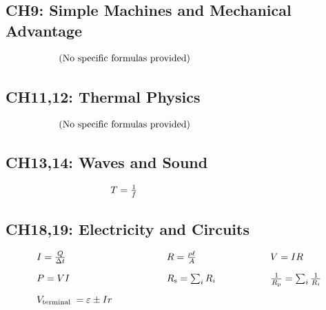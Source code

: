 \documentclass[12pt,a4paper]{article}
\begin{document}
\subsection{CH9: Simple Machines and Mechanical Advantage}
\begin{align*}
\begin{array}{l@{\hspace{2cm}}l@{\hspace{2cm}}l}
\text{(No specific formulas provided)} & &
\end{array}
\end{align*}
\subsection{CH11,12: Thermal Physics}
\begin{align*}
\begin{array}{l@{\hspace{2cm}}l@{\hspace{2cm}}l}
\text{(No specific formulas provided)} & &
\end{array}
\end{align*}
\subsection{CH13,14: Waves and Sound}
\begin{align*}
\begin{array}{l@{\hspace{2cm}}l@{\hspace{2cm}}l}
T=\frac{1}{f} & &
\end{array}
\end{align*}
\subsection{CH18,19: Electricity and Circuits}
\begin{align*}
\begin{array}{l@{\hspace{2cm}}l@{\hspace{2cm}}l}
I=\frac{Q}{\Delta t} & R=\frac{\rho \ell}{A} & V=I R \\[1em]
P=V I & R_{\mathrm{s}}=\sum_{i} R_{i} & \frac{1}{R_{\mathrm{p}}}=\sum_{i} \frac{1}{R_{i}} \\[1em]
V_{\text {terminal }}=\varepsilon \pm I r & &
\end{array}
\end{align*}

\fi
\end{document}
